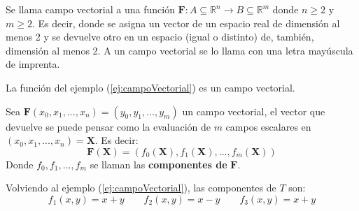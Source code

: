 \begin{definition}
    Se llama campo vectorial a una función $\mathbf{F}:A\subseteq \mathbb{R}^n \rightarrow B \subseteq \mathbb{R}^m$
    donde $n\geq2$ y $m\geq2$. Es decir, donde se asigna un vector de un espacio real de dimensión al menos 2 y se devuelve otro
    en un espacio (igual o distinto) de, también, dimensión al menos 2. 
    A un campo vectorial se lo llama con una letra mayúscula de imprenta.
    
    La función del ejemplo (\ref{ej:campoVectorial}) es un campo vectorial.

    Sea $\mathbf{F}(x_0,x_1,...,x_n)=(y_0,y_1,...,y_m)$ un campo vectorial, el vector que devuelve
    se puede pensar como la evaluación de $m$ campos escalares en $(x_0,x_1,...,x_n)=\boldsymbol{X}$. 
    Es decir:
    \begin{equation*}
        \mathbf{F}(\boldsymbol{X})=(f_0(\boldsymbol{X}),f_1(\boldsymbol{X}),...,f_m(\boldsymbol{X}))
    \end{equation*}
    Donde $f_0,f_1,...,f_m$ se llaman las \textbf{componentes de} $\mathbf{F}$.

    Volviendo al ejemplo (\ref{ej:campoVectorial}), las componentes de $T$ son: 
    \begin{equation*}
        f_1(x,y)=x+y\qquad f_2(x,y)=x-y\qquad f_3(x,y)=x+y
    \end{equation*}
\end{definition}
